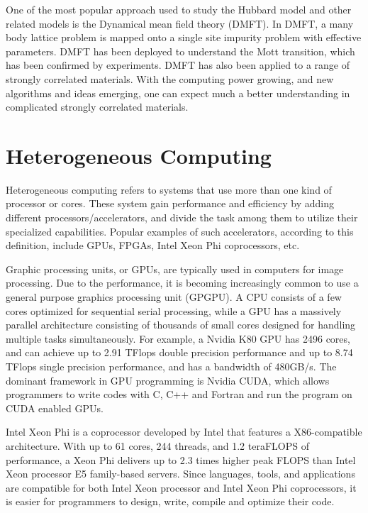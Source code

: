 One of the most popular approach used to study the Hubbard model and other related
models is the Dynamical mean field theory (DMFT). In DMFT, a many body lattice
problem is mapped onto a single site impurity problem with effective parameters.
DMFT has been deployed to understand the Mott transition, which has been confirmed
by experiments. DMFT has also been applied to a range of strongly correlated 
materials. With the computing power growing, and new algorithms and ideas emerging, 
one can expect much a better understanding in complicated strongly correlated 
materials.

\section{Heterogeneous Computing}
Heterogeneous computing refers to systems that use more than one kind of 
processor or cores. These system gain performance and efficiency by adding
different processors/accelerators, and divide the task among them to utilize 
their specialized capabilities. 
Popular examples of such accelerators, according to this definition, include 
GPUs, FPGAs, Intel Xeon Phi coprocessors, etc.


Graphic processing units, or GPUs, are typically used in computers for image 
processing. 
Due to the performance, it is becoming increasingly common to use a general purpose 
graphics processing unit (GPGPU).
A CPU consists of a few cores optimized for sequential serial processing,
while a GPU has a massively parallel architecture 
consisting of thousands of small cores designed for handling multiple tasks 
simultaneously.
For example, a Nvidia K80 GPU has 2496 cores, and can achieve up to 2.91 TFlops 
double precision performance and up to 8.74 TFlops single precision performance, 
and has a bandwidth of 480GB/s.
The dominant framework in GPU programming is Nvidia CUDA, which allows 
programmers to write codes with C, C++ and Fortran and run the program on CUDA
enabled GPUs.


Intel Xeon Phi is a coprocessor developed by Intel that features a 
X86-compatible architecture. With up to 61 cores, 244 threads, 
and 1.2 teraFLOPS of performance, a Xeon Phi delivers up to 2.3 times higher 
peak FLOPS than Intel Xeon processor E5 family-based servers.
Since languages, tools, and applications are compatible for both Intel Xeon 
processor and Intel Xeon Phi coprocessors, it is easier for programmers to
design, write, compile and optimize their code. 


